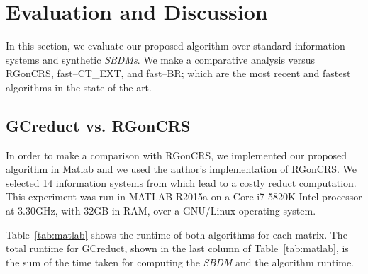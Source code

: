 \documentclass[authoryear,preprint,review,12pt]{elsarticle}
\begin{document}
%	
\section{Evaluation and Discussion}\label{evaluation}
	In this section, we evaluate our proposed algorithm over standard information systems and synthetic \textit{SBDMs}. We make a comparative analysis versus RGonCRS, fast--CT\_EXT, and fast--BR; which are the most recent and fastest algorithms in the state of the art. %
	
\subsection{GCreduct vs. RGonCRS}
	In order to make a comparison with RGonCRS, we implemented our proposed algorithm in Matlab and we used the author's implementation of RGonCRS. We selected 14 information systems from \citep{Bache13} which lead to a costly reduct computation. This experiment was run in MATLAB R2015a on a Core i7-5820K Intel processor at 3.30GHz, with 32GB in RAM, over a GNU/Linux operating system.
	
	Table~\ref{tab:matlab} shows the runtime of both algorithms for each matrix. The total runtime for GCreduct, shown in the last column of Table~\ref{tab:matlab}, is the sum of the time taken for computing the \textit{SBDM} and the algorithm runtime.
	
\end{document}
